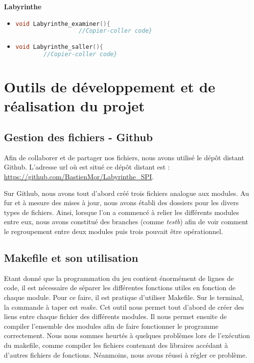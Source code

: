 \documentclass[a4paper,11pt]{report}
\begin{document}
   \textbf{Labyrinthe}
    	\begin{itemize}
      		\item \begin{lstlisting}[language=c] 
void Labyrinthe_examiner(){
      			  //Copier-coller code}
            	  \end{lstlisting}
          
      		\item \begin{lstlisting}[language=c] 
void Labyrinthe_saller(){
        //Copier-coller code}
            	  \end{lstlisting}
  		\end{itemize}

  \chapter{Outils de développement et de réalisation du projet}
  \section{Gestion des fichiers - Github}
  Afin de collaborer et de partager nos fichiers, nous avons utilisé le dépôt distant Github. L'adresse url où est situé ce dépôt distant est : \url{https://github.com/BastienMor/Labyrinthe_SPI}.
  
  Sur Github, nous avons tout d'abord créé trois fichiers analogue aux modules. Au fur et à mesure des mises à jour, nous avons établi des dossiers pour les divers types de fichiers. Ainsi, lorsque l'on a commencé à relier les différents modules entre eux, nous avons constitué des branches (comme \textit{testb}) afin de voir comment le regroupement entre deux modules puis trois pouvait être opérationnel.
  \section{Makefile et son utilisation}
  	Etant donné que la programmation du jeu contient énormément de lignes de code, il est nécessaire de séparer les différentes fonctions utiles en fonction de chaque module. Pour ce faire, il est pratique d'utiliser Makefile. Sur le terminal, la commande à taper est \textit{make}.
	Cet outil nous permet tout d'abord de créer des liens entre chaque fichier des différents modules. Il nous permet ensuite de compiler l'ensemble des modules afin de faire fonctionner le programme correctement.
  	Nous nous sommes heurtés à quelques problèmes lors de l'exécution du makefile, comme compiler les fichiers contenant des libraires accédant à d'autres fichiers de fonctions. Néanmoins, nous avons réussi à régler ce problème.
  
\end{document}
